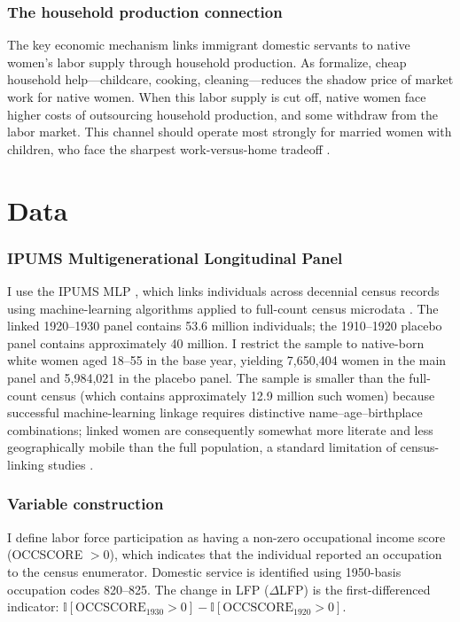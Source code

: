 \documentclass[12pt]{article}
\newcommand{\ind}{\mathbb{I}}
\begin{document}
\subsubsection*{The household production connection} The key economic mechanism links immigrant domestic servants to native women's labor supply through household production. As \citet{CortesTossada2011} formalize, cheap household help---childcare, cooking, cleaning---reduces the shadow price of market work for native women. When this labor supply is cut off, native women face higher costs of outsourcing household production, and some withdraw from the labor market. This channel should operate most strongly for married women with children, who face the sharpest work-versus-home tradeoff \citep{Goldin1990, Costa2000}.


\section{Data}

\subsubsection*{IPUMS Multigenerational Longitudinal Panel} I use the IPUMS MLP \citep{ipumsmlp}, which links individuals across decennial census records using machine-learning algorithms applied to full-count census microdata \citep{Abramitzky2021}. The linked 1920--1930 panel contains 53.6 million individuals; the 1910--1920 placebo panel contains approximately 40 million. I restrict the sample to native-born white women aged 18--55 in the base year, yielding 7,650,404 women in the main panel and 5,984,021 in the placebo panel. The sample is smaller than the full-count census (which contains approximately 12.9 million such women) because successful machine-learning linkage requires distinctive name--age--birthplace combinations; linked women are consequently somewhat more literate and less geographically mobile than the full population, a standard limitation of census-linking studies \citep{Abramitzky2014}.

\subsubsection*{Variable construction} I define labor force participation as having a non-zero occupational income score (OCCSCORE $> 0$), which indicates that the individual reported an occupation to the census enumerator. Domestic service is identified using 1950-basis occupation codes 820--825. The change in LFP ($\Delta$LFP) is the first-differenced indicator: $\ind[\text{OCCSCORE}_{1930} > 0] - \ind[\text{OCCSCORE}_{1920} > 0]$.
\end{document}
